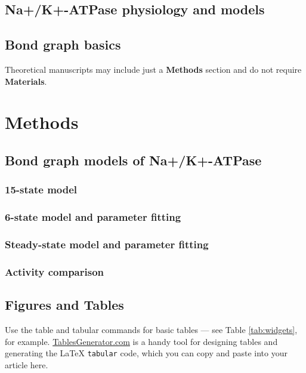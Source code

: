 \documentclass{biophys-new}
\begin{document}
\subsection*{Na+/K+-ATPase physiology and models}


\subsection*{Bond graph basics}

Theoretical manuscripts may include just a \textbf{Methods} section and do not require \textbf{Materials}.


\section*{Methods}


\subsection*{Bond graph models of Na+/K+-ATPase}

\subsubsection{15-state model}



\subsubsection{6-state model and parameter fitting}




\subsubsection{Steady-state model and parameter fitting}

\subsubsection{Activity comparison }

\subsection*{Figures and Tables}

Use the table and tabular commands for basic tables --- see Table \ref{tab:widgets}, for example. \href{http://tablesgenerator.com}{TablesGenerator.com} is a handy tool for designing tables and generating the \LaTeX{} \texttt{tabular} code, which you can copy and paste into your article here.
\end{document}
